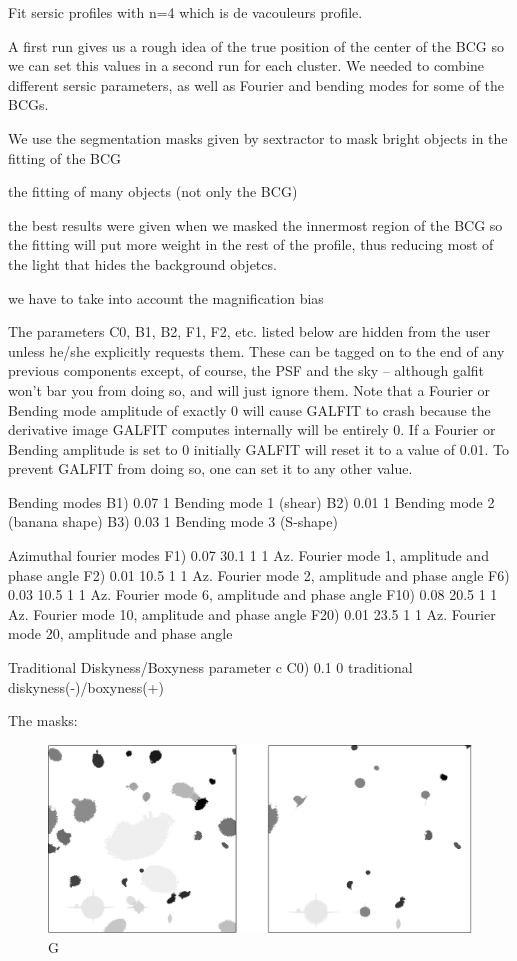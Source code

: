 Fit sersic profiles with n=4 which is de vacouleurs profile. 

A first run gives us a rough idea of the true position of the center of the BCG so we can set this values in a second run for each cluster. We needed to combine different sersic parameters, as well as Fourier and bending modes for some of the BCGs.

We use the segmentation masks given by sextractor to mask bright objects in the fitting of the BCG

the fitting of many objects (not only the BCG)

the best results were given when we masked the innermost region of the BCG so the fitting will put more weight in the rest of the profile, thus reducing most of the light that hides the background objetcs.

we have to take into account the magnification bias

 The parameters C0, B1, B2, F1, F2, etc. listed below are hidden 
 from the user unless he/she explicitly requests them.  These can  be tagged on to the end of any previous components except, of 
 course, the PSF and the sky -- although galfit won't bar you from doing 
 so, and will just ignore them.  Note that a Fourier or Bending mode 
 amplitude of exactly 0 will cause GALFIT to crash because the 
 derivative image GALFIT computes internally will be entirely 0.  If a 
 Fourier or Bending amplitude is set to 0 initially GALFIT will reset it  
 to a value of 0.01.  To prevent GALFIT from doing so, one can set it to any 
 other value.

  Bending modes
B1)  0.07      1        Bending mode 1 (shear)
B2)  0.01      1        Bending mode 2 (banana shape)
B3)  0.03      1        Bending mode 3 (S-shape)

  Azimuthal fourier modes
F1)  0.07  30.1  1  1   Az. Fourier mode 1, amplitude and phase angle
F2)  0.01  10.5  1  1   Az. Fourier mode 2, amplitude and phase angle
F6)  0.03  10.5  1  1  Az. Fourier mode 6, amplitude and phase angle
F10)  0.08  20.5  1  1   Az. Fourier mode 10, amplitude and phase angle
F20)  0.01  23.5  1  1   Az. Fourier mode 20, amplitude and phase angle

  Traditional Diskyness/Boxyness parameter c
C0) 0.1         0       traditional diskyness(-)/boxyness(+)

The masks:

\begin{figure}[H]
\centering
\includegraphics[width=15cm]{images/masks.png}
\caption[M]{G}
\end{figure}

